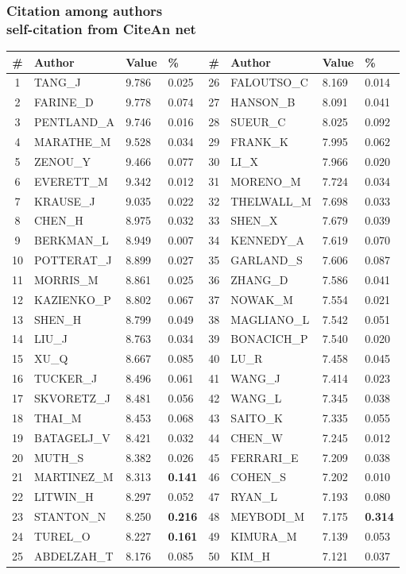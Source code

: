 \documentclass[hyperref={pdfstartview={FitBH -32768},
                         pdfpagemode=FullScreen,
                         plainpages=false,
                         colorlinks=true}
              ]{beamer}
\begin{document}
\begin{frame}[fragile]
\frametitle{Citation among authors\\ \normalsize self-citation from CiteAn net}

\tiny
\begin{center}
\begin{tabular}{c|l|l|l|c|l|l|l|} 
\# &	Author & Value &	\% &  \# &	Author& Value & \% \\ \hline 
1&	TANG\_J&	9.786&	0.025&	26&	FALOUTSO\_C&	8.169&	0.014\\
2&	FARINE\_D&	9.778&	0.074&	27&	HANSON\_B&	8.091&	0.041\\
3&	PENTLAND\_A&	9.746&	0.016&	28&	SUEUR\_C&	8.025&	0.092\\
4&	MARATHE\_M&	9.528&	0.034&	29&	FRANK\_K&	7.995&	0.062\\
5&	ZENOU\_Y&	9.466&	0.077&	30&	LI\_X&	7.966&	0.020\\
6&	EVERETT\_M&	9.342&	0.012&	31&	MORENO\_M&	7.724&	0.034\\
7&	KRAUSE\_J&	9.035&	0.022&	32&	THELWALL\_M&	7.698&	0.033\\
8&	CHEN\_H&	8.975&	0.032&	33&	SHEN\_X&	7.679&	0.039\\
9&	BERKMAN\_L&	8.949&	0.007&	34&	KENNEDY\_A&	7.619&	0.070\\
10&	POTTERAT\_J&	8.899&	0.027&	35&	GARLAND\_S&	7.606&	0.087\\
11&	MORRIS\_M&	8.861&	0.025&	36&	ZHANG\_D&	7.586&	0.041\\
12&	KAZIENKO\_P&	8.802&	0.067&	37&	NOWAK\_M&	7.554&	0.021\\
13&	SHEN\_H&	8.799&	0.049&	38&	MAGLIANO\_L&	7.542&	0.051\\
14&	LIU\_J&	8.763&	0.034&	39&	BONACICH\_P&	7.540&	0.020\\
15&	XU\_Q&	8.667&	0.085&	40&	LU\_R&	7.458&	0.045\\
16&	TUCKER\_J&	8.496&	0.061&	41&	WANG\_J&	7.414&	0.023\\
17&	SKVORETZ\_J&	8.481&	0.056&	42&	WANG\_L&	7.345&	0.038\\
18&	THAI\_M&	8.453&	0.068&	43&	SAITO\_K&	7.335&	0.055\\
19&	BATAGELJ\_V&	8.421&	0.032&	44&	CHEN\_W&	7.245&	0.012\\
20&	MUTH\_S&	8.382&	0.026&	45&	FERRARI\_E&	7.209&	0.038\\
21&	MARTINEZ\_M&	8.313&	\textbf{0.141}&	46&	COHEN\_S&	7.202&	0.010\\
22&	LITWIN\_H&	8.297&	0.052&	47&	RYAN\_L&	7.193&	0.080\\
23&	STANTON\_N&	8.250&	\textbf{0.216}&	48&	MEYBODI\_M&	7.175&	\textbf{0.314}\\
24&	TUREL\_O&	8.227&	\textbf{0.161}&	49&	KIMURA\_M&	7.139&	0.053\\
25&	ABDELZAH\_T&	8.176&	0.085&	50&	KIM\_H&	7.121&	0.037\\
\end{tabular} 
\end{center}

\end{frame}
\end{document}

